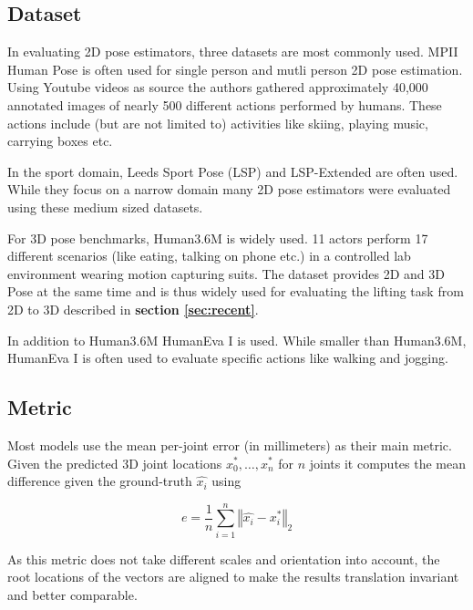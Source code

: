 \documentclass[twoside]{article}
\begin{document}
\begin{multicols}{2}
\subsection{Dataset}
\label{sec:dataset}

In evaluating 2D pose estimators, three datasets are most commonly used.
MPII Human Pose \cite{andriluka_2d_2014} is often used for single person and mutli person 2D pose estimation.
Using Youtube videos as source the authors gathered approximately 40,000 annotated images of nearly 500 different actions performed by humans.
These actions include (but are not limited to) activities like skiing, playing music, carrying boxes etc.

In the sport domain, Leeds Sport Pose (LSP) \cite{johnson_clustered_2010} and LSP-Extended \cite{johnson_learning_2011} are often used.
While they focus on a narrow domain many 2D pose estimators were evaluated using these medium sized datasets.

For 3D pose benchmarks, Human3.6M \cite{ionescu_human3.6m:_2014} is widely used.
11 actors perform 17 different scenarios (like eating, talking on phone etc.) in a controlled lab environment wearing motion capturing suits.
The dataset provides 2D and 3D Pose at the same time and is thus widely used for evaluating the lifting task from 2D to 3D described in \textbf{section \ref{sec:recent}}.

In addition to Human3.6M HumanEva I \cite{sigal_humaneva:_2010} is used.
While smaller than Human3.6M, HumanEva I is often used to evaluate specific actions like walking and jogging.


\subsection{Metric}

Most models use the mean per-joint error (in millimeters) as their main metric.
Given the predicted 3D joint locations $x_0^{*}, \dots, x_n^{*}$ for $n$ joints it computes the mean difference given the ground-truth $\hat{x_i}$ using

\newcommand\norm[1]{\left\Vert#1\right\Vert}

\[
    e = \frac{1}{n} \sum_{i=1}^{n} \norm{\hat{x_i} - x_i^{*}}_2
\]

As this metric does not take different scales and orientation into account, the root locations of the vectors are aligned to make the results translation invariant and better comparable.






\end{multicols}
\end{document}
